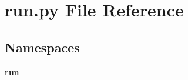 \section{run.\+py File Reference}
\label{run_8py}
\subsection*{Namespaces}
\begin{DoxyCompactItemize}
\item 
 \textbf{ run}
\end{DoxyCompactItemize}
